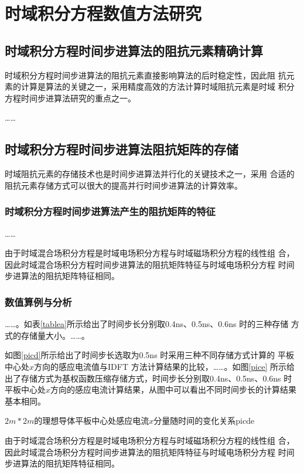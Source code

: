 
\chapter{时域积分方程数值方法研究}
\section{时域积分方程时间步进算法的阻抗元素精确计算}
时域积分方程时间步进算法的阻抗元素直接影响算法的后时稳定性，因此阻
抗元素的计算是算法的关键之一，采用精度高效的方法计算时域阻抗元素是时域
积分方程时间步进算法研究的重点之一。

……
\section{时域积分方程时间步进算法阻抗矩阵的存储}
时域阻抗元素的存储技术也是时间步进算法并行化的关键技术之一，采用
合适的阻抗元素存储方式可以很大的提高并行时间步进算法的计算效率。
\subsection{时域积分方程时间步进算法产生的阻抗矩阵的特征}
……

由于时域混合场积分方程是时域电场积分方程与时域磁场积分方程的线性组
合，因此时域混合场积分方程时间步进算法的阻抗矩阵特征与时域电场积分方程
时间步进算法的阻抗矩阵特征相同。
\subsection{数值算例与分析}
……。如表\ref{tablea}所示给出了时间步长分别取0.4ns、0.5ns、0.6ns 时的三种存储
方式的存储量大小。……。

如图\ref{picd}所示给出了时间步长选取为0.5ns 时采用三种不同存储方式计算的
平板中心处$x$方向的感应电流值与IDFT 方法计算结果的比较，……。如图\ref{pice}
所示给出了存储方式为基权函数压缩存储方式，时间步长分别取0.4ns、0.5ns、0.6ns
时平板中心处$x$方向的感应电流计算结果，从图中可以看出不同时间步长的计算结果基本相同。

\begin{pics}[h]{$2m*2m$的理想导体平板中心处感应电流$x$分量随时间的变化关系}{picde}
\end{pics}
%
由于时域混合场积分方程是时域电场积分方程与时域磁场积分方程的线性组
合，因此时域混合场积分方程时间步进算法的阻抗矩阵特征与时域电场积分方程
时间步进算法的阻抗矩阵特征相同。
